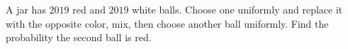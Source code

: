 A jar has $2019$ red and $2019$ white balls. Choose one uniformly and replace it with the opposite color, mix, then choose another ball uniformly. Find the probability the second ball is red.
